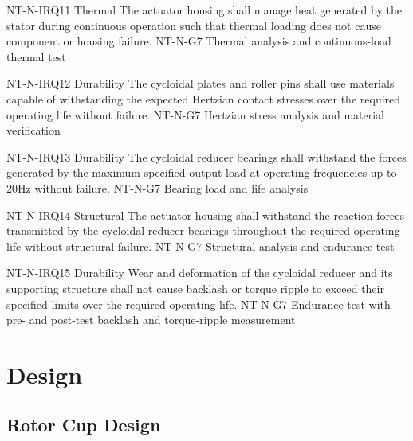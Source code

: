 \documentclass[confidential]{../../../classes/nervtech-engdoc}
\begin{document}
\begin{requirementstable}

  \reqrow
  {NT-N-IRQ11}
  {Thermal}
  {The actuator housing shall manage heat generated by the stator during continuous operation such that thermal loading does not cause component or housing failure.}
  {NT-N-G7}
  {Thermal analysis and continuous-load thermal test}

  \reqrow
  {NT-N-IRQ12}
  {Durability}
  {The cycloidal plates and roller pins shall use materials capable of withstanding the expected Hertzian contact stresses over the required operating life without failure.}
  {NT-N-G7}
  {Hertzian stress analysis and material verification}

  \reqrow
  {NT-N-IRQ13}
  {Durability}
  {The cycloidal reducer bearings shall withstand the forces generated by the maximum specified output load at operating frequencies up to 20Hz without failure.}
  {NT-N-G7}
  {Bearing load and life analysis}

  \reqrow
  {NT-N-IRQ14}
  {Structural}
  {The actuator housing shall withstand the reaction forces transmitted by the cycloidal reducer bearings throughout the required operating life without structural failure.}
  {NT-N-G7}
  {Structural analysis and endurance test}

  \reqrow
  {NT-N-IRQ15}
  {Durability}
  {Wear and deformation of the cycloidal reducer and its supporting structure shall not cause backlash or torque ripple to exceed their specified limits over the required operating life.}
  {NT-N-G7}
  {Endurance test with pre- and post-test backlash and torque-ripple measurement}

\end{requirementstable}
\newpage
\section{Design}
\subsection{Rotor Cup Design}
\end{document}
